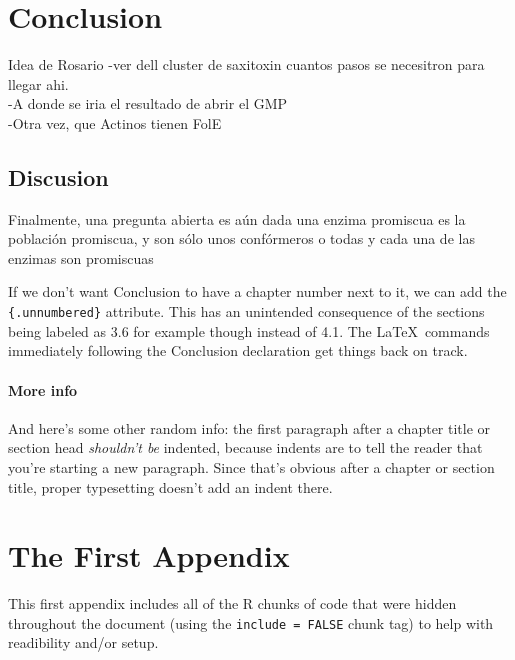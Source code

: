 \documentclass[12pt,twoside]{reedthesis}
\begin{document}
  \chapter*{Conclusion}\label{conclusion}
  
  \setcounter{chapter}{4} \setcounter{section}{0}
  
  Idea de Rosario -ver dell cluster de saxitoxin cuantos pasos se
  necesitron para llegar ahi.\\
  -A donde se iria el resultado de abrir el GMP\\
  -Otra vez, que Actinos tienen FolE
  
  \section{Discusion}\label{discusion-1}
  
  Finalmente, una pregunta abierta es aún dada una enzima promiscua es la
  población promiscua, y son sólo unos confórmeros o todas y cada una de
  las enzimas son promiscuas
  
  If we don't want Conclusion to have a chapter number next to it, we can
  add the \texttt{\{.unnumbered\}} attribute. This has an unintended
  consequence of the sections being labeled as 3.6 for example though
  instead of 4.1. The \LaTeX~commands immediately following the Conclusion
  declaration get things back on track.
  
  \subsubsection{More info}\label{more-info}
  
  And here's some other random info: the first paragraph after a chapter
  title or section head \emph{shouldn't be} indented, because indents are
  to tell the reader that you're starting a new paragraph. Since that's
  obvious after a chapter or section title, proper typesetting doesn't add
  an indent there.
  
  \appendix
  
  \chapter{The First Appendix}\label{the-first-appendix}
  
  This first appendix includes all of the R chunks of code that were
  hidden throughout the document (using the \texttt{include\ =\ FALSE}
  chunk tag) to help with readibility and/or setup.
  
\end{document}
